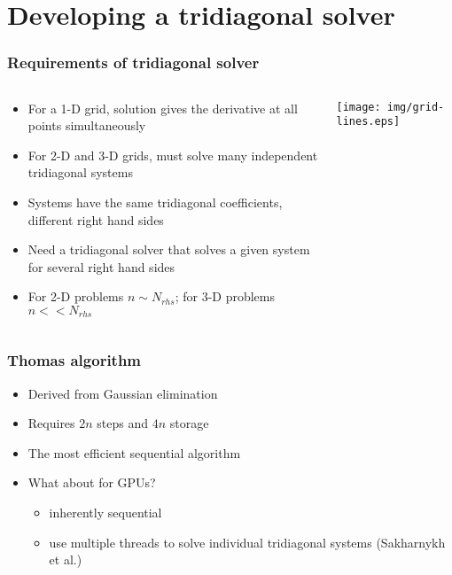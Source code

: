 \section{Developing a tridiagonal solver}

\begin{frame}
\frametitle{Requirements of tridiagonal solver}
\begin{columns}
\begin{column}{0.5\textwidth}
\begin{itemize}
\item For a 1-D grid, solution gives the derivative
    at all points simultaneously
\item For 2-D and 3-D grids,
    must solve many independent tridiagonal systems
\item Systems have the same tridiagonal coefficients,
    different right hand sides
\item Need a tridiagonal solver that solves
    a given system for several right hand sides
\item For 2-D problems $n \sim N_{rhs}$;
    for 3-D problems $n << N_{rhs}$
\end{itemize}
\end{column}
\begin{column}{0.5\textwidth}
    \hspace{1cm}
    \texttt{[image: img/grid-lines.eps]}
\end{column}
\end{columns}
\end{frame}

\begin{frame}
\frametitle{Thomas algorithm}
\begin{itemize}
\item Derived from Gaussian elimination
\item Requires $2n$ steps and $4n$ storage
\item The most efficient sequential algorithm
\item What about for GPUs?
    \begin{itemize}
        \item inherently sequential
        \item use multiple threads to solve
            individual tridiagonal systems
            (Sakharnykh et al.)
    \end{itemize}
\end{itemize}
\end{frame}

